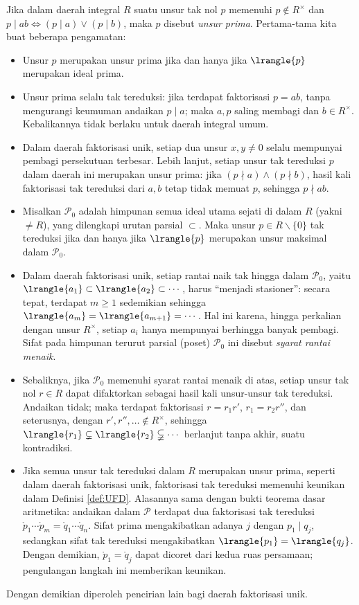 Jika dalam daerah integral $R$ suatu unsur tak nol $p$ memenuhi $p \notin R^\times$ dan $p \mid ab \iff (p \mid a) \vee (p \mid b)$, maka $p$ disebut \emph{unsur prima}. Pertama-tama kita buat beberapa pengamatan:
\begin{itemize}
	\item Unsur $p$ merupakan unsur prima jika dan hanya jika $\lrangle{p}$ merupakan ideal prima.
	\item Unsur prima selalu tak tereduksi: jika terdapat faktorisasi $p=ab$, tanpa mengurangi keumuman andaikan $p \mid a$; maka $a,p$ saling membagi dan $b \in R^\times$. Kebalikannya tidak berlaku untuk daerah integral umum.
	\item Dalam daerah faktorisasi unik, setiap dua unsur $x,y \neq 0$ selalu mempunyai pembagi persekutuan terbesar. Lebih lanjut, setiap unsur tak tereduksi $p$ dalam daerah ini merupakan unsur prima: jika $(p \nmid a) \wedge (p \nmid b)$, hasil kali faktorisasi tak tereduksi dari $a,b$ tetap tidak memuat $p$, sehingga $p \nmid ab$.
	\item Misalkan $\mathcal{P}_0$ adalah himpunan semua ideal utama sejati di dalam $R$ (yakni $\neq R$), yang dilengkapi urutan parsial $\subset$. Maka unsur $p \in R \smallsetminus \{0\}$ tak tereduksi jika dan hanya jika $\lrangle{p}$ merupakan unsur maksimal dalam $\mathcal{P}_0$.
	\item Dalam daerah faktorisasi unik, setiap rantai naik tak hingga dalam $\mathcal{P}_0$, yaitu $\lrangle{a_1} \subset \lrangle{a_2} \subset \cdots$, harus ``menjadi stasioner'': secara tepat, terdapat $m \geq 1$ sedemikian sehingga $\lrangle{a_m} = \lrangle{a_{m+1}} = \cdots$. Hal ini karena, hingga perkalian dengan unsur $R^\times$, setiap $a_i$ hanya mempunyai berhingga banyak pembagi. Sifat pada himpunan terurut parsial (poset) $\mathcal{P}_0$ ini disebut \emph{syarat rantai menaik}.
	\item Sebaliknya, jika $\mathcal{P}_0$ memenuhi syarat rantai menaik di atas, setiap unsur tak nol $r \in R$ dapat difaktorkan sebagai hasil kali unsur-unsur tak tereduksi. Andaikan tidak; maka terdapat faktorisasi $r = r_1 r'$, $r_1 = r_2 r''$, dan seterusnya, dengan $r', r'', \ldots \notin R^\times$, sehingga $\lrangle{r_1} \subsetneq \lrangle{r_2} \subsetneqq \cdots$ berlanjut tanpa akhir, suatu kontradiksi.
	\item Jika semua unsur tak tereduksi dalam $R$ merupakan unsur prima, seperti dalam daerah faktorisasi unik, faktorisasi tak tereduksi memenuhi keunikan dalam Definisi \ref{def:UFD}. Alasannya sama dengan bukti teorema dasar aritmetika: andaikan dalam $\mathcal{P}$ terdapat dua faktorisasi tak tereduksi $\mathring{p}_1 \cdots \mathring{p}_m =  \mathring{q}_1 \cdots \mathring{q}_n$. Sifat prima mengakibatkan adanya $j$ dengan $p_1 \mid q_j$, sedangkan sifat tak tereduksi mengakibatkan $\lrangle{p_1} = \lrangle{q_j}$. Dengan demikian, $\mathring{p}_1 = \mathring{q}_j$ dapat dicoret dari kedua ruas persamaan; pengulangan langkah ini memberikan keunikan.
\end{itemize}
Dengan demikian diperoleh pencirian lain bagi daerah faktorisasi unik.

